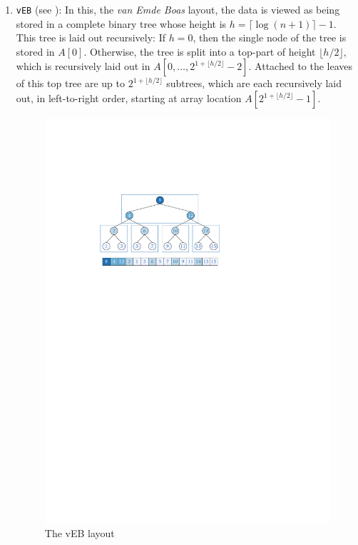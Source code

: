 \documentclass{patmorin}
\begin{document}
\begin{enumerate}

  \item \texttt{vEB} (see ): In this, the \emph{van Emde
  Boas} layout, the data is viewed as being stored in a complete binary
  tree whose height is $h=\lceil\log (n+1)\rceil -1$. This tree is
  laid out recursively:  If $h=0$, then the single node of the tree
  is stored in $A[0]$.  Otherwise, the tree is split into a top-part
  of height $\lfloor h/2\rfloor$, which is recursively laid out in
  $A[0,\ldots,2^{1+\lfloor{h/2\rfloor}}-2]$.  Attached to the leaves of
  this top tree are up to $2^{1+\lfloor{h/2\rfloor}}$ subtrees, which
  are each recursively laid out, in left-to-right order, starting at
  array location $A[2^{1+\lfloor{h/2\rfloor}}-1]$.

  \begin{figure}
    \begin{center}\includegraphics{veb}\end{center}
    \caption{The vEB layout}
  \end{figure}


\end{enumerate}
\end{document}

